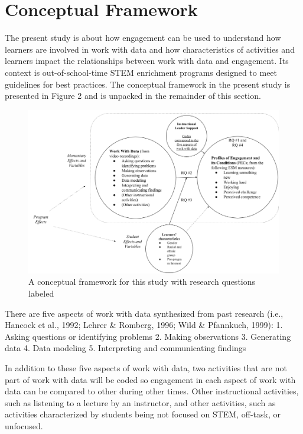 \documentclass[]{book}
\theoremstyle{definition}
\theoremstyle{definition}
\theoremstyle{definition}
\theoremstyle{remark}
\begin{document}
\section{Conceptual Framework}\label{conceptual-framework}

The present study is about how engagement can be used to understand how
learners are involved in work with data and how characteristics of
activities and learners impact the relationships between work with data
and engagement. Its context is out-of-school-time STEM enrichment
programs designed to meet guidelines for best practices. The conceptual
framework in the present study is presented in Figure 2 and is unpacked
in the remainder of this section.

\begin{figure}

{\centering \includegraphics[width=0.8\linewidth]{images/figure2} 

}

\caption{A conceptual framework for this study with research questions labeled}\label{fig:unnamed-chunk-2}
\end{figure}

There are five aspects of work with data synthesized from past research
(i.e., Hancock et al., 1992; Lehrer \& Romberg, 1996; Wild \& Pfannkuch,
1999): 1. Asking questions or identifying problems 2. Making
observations 3. Generating data 4. Data modeling 5. Interpreting and
communicating findings

In addition to these five aspects of work with data, two activities that
are not part of work with data will be coded so engagement in each
aspect of work with data can be compared to other during other times.
Other instructional activities, such as listening to a lecture by an
instructor, and other activities, such as activities characterized by
students being not focused on STEM, off-task, or unfocused.
\end{document}
